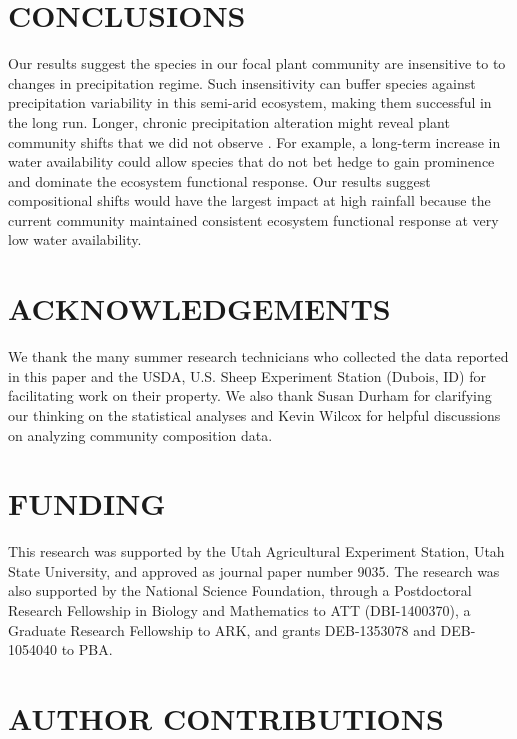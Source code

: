\documentclass[fleqn,10pt,lineno]{wlpeerj} %
\begin{document}
\section{CONCLUSIONS}\label{conclusions}

Our results suggest the species in our focal plant community are
insensitive to to changes in precipitation regime. Such insensitivity
can buffer species against precipitation variability in this semi-arid
ecosystem, making them successful in the long run. Longer, chronic
precipitation alteration might reveal plant community shifts that we did
not observe \citep[e.g.,][]{Wilcox2016}. For example, a long-term
increase in water availability could allow species that do not bet hedge
to gain prominence and dominate the ecosystem functional response.
Our results suggest compositional shifts would have the largest impact
at high rainfall because the current community maintained consistent
ecosystem functional response at very low water availability.

\section{ACKNOWLEDGEMENTS}\label{acknowledgements}

We thank the many summer research technicians who collected the data
reported in this paper and the USDA, U.S. Sheep Experiment Station
(Dubois, ID) for facilitating work on their property. We also thank
Susan Durham for clarifying our thinking on the statistical analyses and
Kevin Wilcox for helpful discussions on analyzing community composition
data.

\section{FUNDING}\label{funding}

This research was supported by the Utah Agricultural Experiment Station,
Utah State University, and approved as journal paper number 9035. The
research was also supported by the National Science Foundation, through
a Postdoctoral Research Fellowship in Biology and Mathematics to ATT
(DBI-1400370), a Graduate Research Fellowship to ARK, and grants
DEB-1353078 and DEB-1054040 to PBA.

\section{AUTHOR CONTRIBUTIONS}\label{author-contributions}
\end{document}
